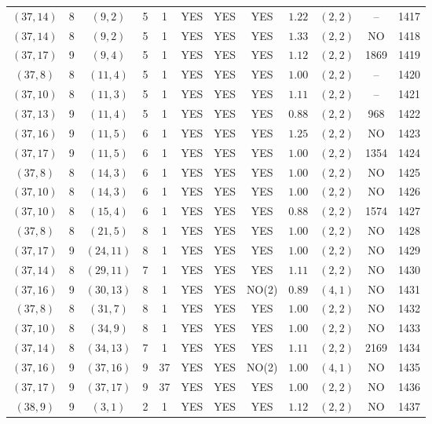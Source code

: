 \begin{longtable}{|c|c|c|c|c|c|c|c|c|c|c|c|}
$(37,14)$ & 8 & $(9,2)$ & 5 & 1 & YES & YES & YES & $1.22$ & $(2,2)$ & -- & 1417\\
$(37,14)$ & 8 & $(9,2)$ & 5 & 1 & YES & YES & YES & $1.33$ & $(2,2)$ & NO & 1418\\
$(37,17)$ & 9 & $(9,4)$ & 5 & 1 & YES & YES & YES & $1.12$ & $(2,2)$ & 1869 & 1419\\
$(37,8)$ & 8 & $(11,4)$ & 5 & 1 & YES & YES & YES & $1.00$ & $(2,2)$ & -- & 1420\\
$(37,10)$ & 8 & $(11,3)$ & 5 & 1 & YES & YES & YES & $1.11$ & $(2,2)$ & -- & 1421\\
$(37,13)$ & 9 & $(11,4)$ & 5 & 1 & YES & YES & YES & $0.88$ & $(2,2)$ & 968 & 1422\\
$(37,16)$ & 9 & $(11,5)$ & 6 & 1 & YES & YES & YES & $1.25$ & $(2,2)$ & NO & 1423\\
$(37,17)$ & 9 & $(11,5)$ & 6 & 1 & YES & YES & YES & $1.00$ & $(2,2)$ & 1354 & 1424\\
$(37,8)$ & 8 & $(14,3)$ & 6 & 1 & YES & YES & YES & $1.00$ & $(2,2)$ & NO & 1425\\
$(37,10)$ & 8 & $(14,3)$ & 6 & 1 & YES & YES & YES & $1.00$ & $(2,2)$ & NO & 1426\\
$(37,10)$ & 8 & $(15,4)$ & 6 & 1 & YES & YES & YES & $0.88$ & $(2,2)$ & 1574 & 1427\\
$(37,8)$ & 8 & $(21,5)$ & 8 & 1 & YES & YES & YES & $1.00$ & $(2,2)$ & NO & 1428\\
$(37,17)$ & 9 & $(24,11)$ & 8 & 1 & YES & YES & YES & $1.00$ & $(2,2)$ & NO & 1429\\
$(37,14)$ & 8 & $(29,11)$ & 7 & 1 & YES & YES & YES & $1.11$ & $(2,2)$ & NO & 1430\\
$(37,16)$ & 9 & $(30,13)$ & 8 & 1 & YES & YES & NO(2) & $0.89$ & $(4,1)$ & NO & 1431\\
$(37,8)$ & 8 & $(31,7)$ & 8 & 1 & YES & YES & YES & $1.00$ & $(2,2)$ & NO & 1432\\
$(37,10)$ & 8 & $(34,9)$ & 8 & 1 & YES & YES & YES & $1.00$ & $(2,2)$ & NO & 1433\\
$(37,14)$ & 8 & $(34,13)$ & 7 & 1 & YES & YES & YES & $1.11$ & $(2,2)$ & 2169 & 1434\\
$(37,16)$ & 9 & $(37,16)$ & 9 & 37 & YES & YES & NO(2) & $1.00$ & $(4,1)$ & NO & 1435\\
$(37,17)$ & 9 & $(37,17)$ & 9 & 37 & YES & YES & YES & $1.00$ & $(2,2)$ & NO & 1436\\
$(38,9)$ & 9 & $(3,1)$ & 2 & 1 & YES & YES & YES & $1.12$ & $(2,2)$ & NO & 1437\\

\end{longtable}
